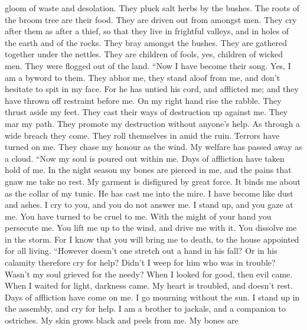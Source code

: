 gloom of waste and desolation.  They pluck salt herbs by
the bushes. The roots of the broom tree are their food. 
They are driven out from amongst men. They cry after them as after a
thief,  so that they live in frightful valleys, and in
holes of the earth and of the rocks.  They bray amongst
the bushes. They are gathered together under the nettles. 
They are children of fools, yes, children of wicked men. They were
flogged out of the land.  ``Now I have become their song.
Yes, I am a byword to them.  They abhor me, they stand
aloof from me, and don't hesitate to spit in my face. 
For he has untied his cord, and afflicted me; and they have thrown off
restraint before me.  On my right hand rise the rabble.
They thrust aside my feet. They cast their ways of destruction up
against me.  They mar my path. They promote my
destruction without anyone's help.  As through a wide
breach they come. They roll themselves in amid the ruin. 
Terrors have turned on me. They chase my honour as the wind. My welfare
has passed away as a cloud.  ``Now my soul is poured out
within me. Days of affliction have taken hold of me.  In
the night season my bones are pierced in me, and the pains that gnaw me
take no rest.  My garment is disfigured by great force.
It binds me about as the collar of my tunic.  He has cast
me into the mire. I have become like dust and ashes.  I
cry to you, and you do not answer me. I stand up, and you gaze at me.
 You have turned to be cruel to me. With the might of
your hand you persecute me.  You lift me up to the wind,
and drive me with it. You dissolve me in the storm.  For
I know that you will bring me to death, to the house appointed for all
living.  ``However doesn't one stretch out a hand in his
fall? Or in his calamity therefore cry for help?  Didn't
I weep for him who was in trouble? Wasn't my soul grieved for the needy?
 When I looked for good, then evil came. When I waited
for light, darkness came.  My heart is troubled, and
doesn't rest. Days of affliction have come on me.  I go
mourning without the sun. I stand up in the assembly, and cry for help.
 I am a brother to jackals, and a companion to ostriches.
 My skin grows black and peels from me. My bones are
